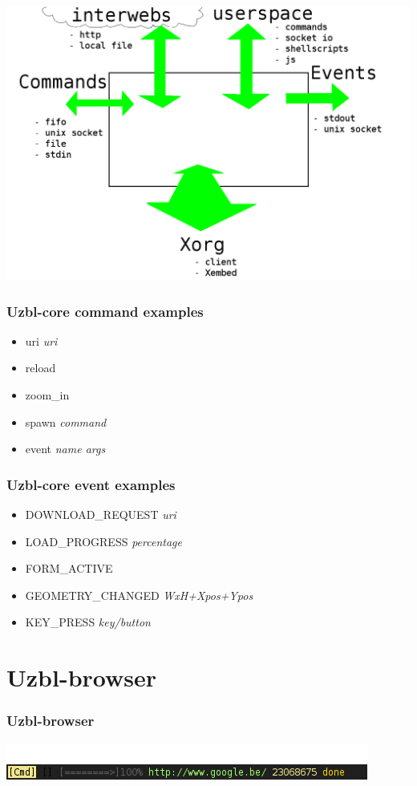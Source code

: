 \documentclass{beamer}
\begin{document}
\frame
{ %
\includegraphics[scale=0.35]{uzbl-core-io.png}
}

\frame
{
\frametitle{Uzbl-core command examples}
\begin{itemize}
	\Large
	\item uri \textit{uri}
	\item reload
	\item zoom\_in
	\item spawn \textit{command}
        \item event \textit{name args} %
\end{itemize}
}

\frame
{
\frametitle{Uzbl-core event examples}
\begin{itemize}
\Large
\item DOWNLOAD\_REQUEST \textit{uri}
\item LOAD\_PROGRESS \textit{percentage}
\item FORM\_ACTIVE
\item GEOMETRY\_CHANGED \textit{WxH+Xpos+Ypos}
\item KEY\_PRESS \textit{key/button} %
\end{itemize}
}


\section{Uzbl-browser}
\frame
{
\frametitle{Uzbl-browser}
\includegraphics[scale=0.8]{uzbl-browser-statusbar.png}
}
\end{document}
